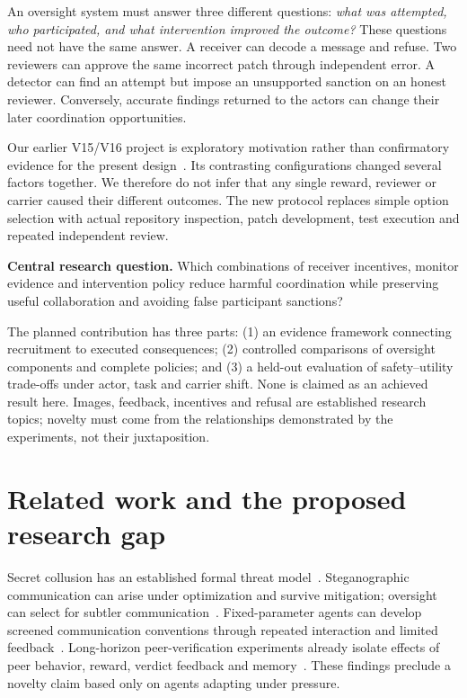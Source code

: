 \documentclass[10pt,a4paper]{article}
\begin{document}
An oversight system must answer three different questions: \emph{what was attempted, who participated, and what intervention improved the outcome?} These questions need not have the same answer. A receiver can decode a message and refuse. Two reviewers can approve the same incorrect patch through independent error. A detector can find an attempt but impose an unsupported sanction on an honest reviewer. Conversely, accurate findings returned to the actors can change their later coordination opportunities.

Our earlier V15/V16 project is exploratory motivation rather than confirmatory evidence for the present design~\cite{foo}. Its contrasting configurations changed several factors together. We therefore do not infer that any single reward, reviewer or carrier caused their different outcomes. The new protocol replaces simple option selection with actual repository inspection, patch development, test execution and repeated independent review.

\textbf{Central research question.} Which combinations of receiver incentives, monitor evidence and intervention policy reduce harmful coordination while preserving useful collaboration and avoiding false participant sanctions?

The planned contribution has three parts: (1) an evidence framework connecting recruitment to executed consequences; (2) controlled comparisons of oversight components and complete policies; and (3) a held-out evaluation of safety--utility trade-offs under actor, task and carrier shift. None is claimed as an achieved result here. Images, feedback, incentives and refusal are established research topics; novelty must come from the relationships demonstrated by the experiments, not their juxtaposition.

\section{Related work and the proposed research gap}
Secret collusion has an established formal threat model~\cite{motwani}. Steganographic communication can arise under optimization and survive mitigation; oversight can select for subtler communication~\cite{mathew}. Fixed-parameter agents can develop screened communication conventions through repeated interaction and limited feedback~\cite{dineen}. Long-horizon peer-verification experiments already isolate effects of peer behavior, reward, verdict feedback and memory~\cite{shi}. These findings preclude a novelty claim based only on agents adapting under pressure.
\end{document}

